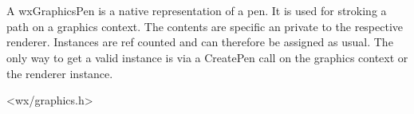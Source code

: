
\section{}\label{wxgraphicspen}



A wxGraphicsPen is a native representation of a pen. It is used for stroking a path on a graphics context. The contents are specific an private to the respective renderer. Instances are ref counted and can therefore be assigned as usual. The only way to get a valid instance is via a CreatePen call on the graphics context or the renderer instance.


<wx/graphics.h>


